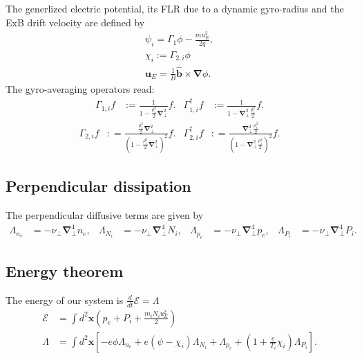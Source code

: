 \documentclass{hitec} %
\renewcommand{\vec}[1]{\boldsymbol{#1}}
\begin{document}
The generlized electric potential, its FLR due to a dynamic gyro-radius and the ExB drift velocity are defined by
\begin{align}
 \psi_i  = \Gamma_{1} \phi - \frac{m u_E^2 }{2 q}, \\ 
 \chi_i := \Gamma_{2,i} \phi \\
 \vec{u}_E = \frac{1}{B} \vec{\hat{b}} \times \vec{\nabla} \phi .
\end{align}
The gyro-averaging operators read:
\begin{align}\label{eq:gamma1def} 
 \Gamma_{1,i} f&:= \frac{1}{1-\frac{\rho_i^2}{2}\vec{\nabla}_\perp^2} f. & 
  \Gamma_{1,i}^\dagger f&:= \frac{1}{1-\vec{\nabla}_\perp^2\frac{\rho_i^2}{2}} f.
\end{align}
\begin{align}\label{eq:gamma2def}
 \Gamma_{2,i} f&: = \frac{\frac{\rho_i^2}{2}\vec{\nabla}_\perp^2}{\left(1-\frac{\rho_i^2}{2}\vec{\nabla}_\perp^2\right)^2} f.&
 \Gamma_{2,i}^\dagger f&: = \frac{\vec{\nabla}_\perp^2\frac{\rho_i^2}{2}}{\left(1-\vec{\nabla}_\perp^2\frac{\rho_i^2}{2}\right)^2} f. 
\end{align}
\subsection{Perpendicular dissipation}
The perpendicular diffusive terms are given by
\begin{align}\label{eq:perpdiffNT}
 \Lambda_{n_e} &=  -\nu_\perp \vec{\nabla}_\perp^4 n_e, &
 \Lambda_{N_i} &=  -\nu_\perp \vec{\nabla}_\perp^4 N_i, &
 \Lambda_{p_e} &=  -\nu_\perp \vec{\nabla}_\perp^4 p_e, &
 \Lambda_{P_i} &=  -\nu_\perp \vec{\nabla}_\perp^4 P_i.
\end{align}
\subsection{Energy theorem}
The energy of our system is \(\frac{d}{d t}\mathcal{E}=\Lambda\)
\begin{align}
 \mathcal{E} &= \int d^2 \vec{x} \left( p_e + P_i + \frac{m_i N_i u_E^2}{2} \right)\\
 \Lambda &= \int d^2 \vec{x} \left[- e \phi \Lambda_{n_e} + e\left( \psi -\chi_i\right) \Lambda_{N_i} + \Lambda_{p_e} + \left(1+ \frac{e}{T_i}\chi_i\right)\Lambda_{P_i} \right].
\end{align}
\end{document}

